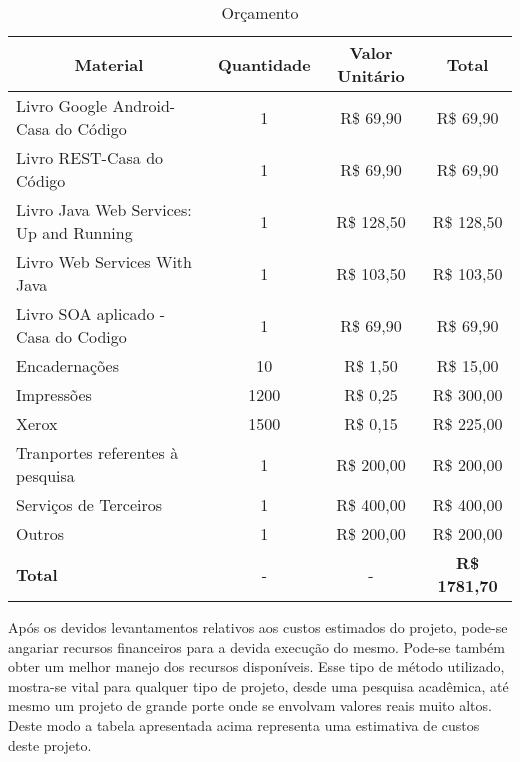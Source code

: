 \begin{table} [h]
  \caption[Orçamento]
          {Orçamento}
  \centering
  \begin{small}
  \setlength{\tabcolsep}{1pt}
  \begin{tabular}{|p{3.5in}|c|c|c|}
    \hline 
    \multicolumn{1}{|c|}{\textbf{Material}} & 
    \multicolumn{1}{c|}{\textbf{Quantidade}} &
    \multicolumn{1}{c|}{\textbf{Valor Unitário}} &
    \multicolumn{1}{c|}{\textbf{Total}}\\\hline\hline 
    
    Livro Google Android-Casa do Código &1 &R\$ 69,90 &R\$ 69,90 \\\hline
    
    Livro REST-Casa do Código &1 &R\$ 69,90 &R\$ 69,90 \\\hline
    
    Livro Java Web Services: Up and Running   &1   &R\$ 128,50 &R\$ 128,50 \\\hline
    
    Livro Web Services With Java   &1   &R\$ 103,50 &R\$ 103,50 \\\hline
    
    Livro SOA aplicado - Casa do Codigo  &1   &R\$ 69,90 &R\$ 69,90 \\\hline 
    
    Encadernações &10   &R\$ 1,50 &R\$ 15,00 \\\hline
    
    Impressões            &1200  &R\$ 0,25 &R\$ 300,00 \\\hline
    
    Xerox &1500  &R\$ 0,15 &R\$ 225,00 \\\hline
    
    Tranportes referentes à pesquisa &1  &R\$ 200,00 &R\$ 200,00 \\\hline
    
    Serviços de Terceiros &1  &R\$ 400,00 &R\$ 400,00 \\\hline
    
    Outros &1  &R\$ 200,00 &R\$ 200,00 \\\hline
    
    \textbf{Total}        &-   &-         &\textbf{R\$ 1781,70} \\\hline
    
  \end{tabular}
  \end{small}
  
\end{table}

	\par Após os devidos levantamentos relativos aos custos estimados do projeto,
pode-se angariar recursos financeiros para a devida execução do mesmo. Pode-se
também obter um melhor manejo dos recursos disponíveis. Esse tipo de método
utilizado, mostra-se vital para qualquer tipo de projeto, desde uma pesquisa
acadêmica, até mesmo um projeto de grande porte onde se envolvam valores reais
muito altos. Deste modo a tabela apresentada acima representa uma estimativa de custos
deste projeto.
